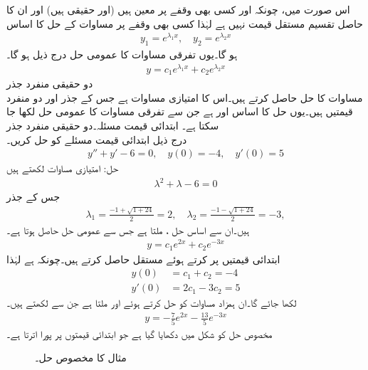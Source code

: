اس صورت میں، چونکہ  اور  کسی بھی وقفے  پر معین ہیں (اور حقیقی ہیں)  اور ان کا حاصل تقسیم مستقل قیمت نہیں ہے لہٰذا کسی بھی وقفے  پر مساوات  کے حل کا اساس
\begin{align}
y_1=e^{\lambda_1 x}, \quad y_2=e^{\lambda_2 x}
\end{align}
ہو گا۔یوں تفرقی مساوات کا عمومی حل درج ذیل ہو گا۔
\begin{align}
y=c_1e^{\lambda_1 x}+c_2 e^{\lambda_2 x}
\end{align}
\quad دو حقیقی منفرد جذر\\
مساوات  کا حل حاصل کرتے ہیں۔اس کا امتیازی مساوات  ہے جس کے جذر  اور   دو منفرد قیمتیں ہیں۔یوں حل کا اساس  اور  ہے جن سے تفرقی مساوات کا عمومی حل  لکھا جا سکتا ہے۔
\quad ابتدائی قیمت مسئلہ۔دو حقیقی منفرد جذر\\
درج ذیل ابتدائی قیمت مسئلے کو حل کریں۔
\begin{align*}
y''+y'-6=0,\quad y(0)=-4, \quad y'(0)=5
\end{align*} 
حل: امتیازی مساوات لکھتے ہیں
\begin{align*}
\lambda^2+\lambda-6=0
\end{align*}
جس کے جذر
\begin{align*}
\lambda_1=\frac{-1+\sqrt{1+24}}{2}=2, \quad \lambda_2=\frac{-1-\sqrt{1+24}}{2}=-3,
\end{align*}
ہیں۔ان سے اساس حل ،  ملتا ہے جس سے عمومی حل حاصل ہوتا ہے۔
\begin{align*}
y=c_1e^{2x}+c_2e^{-3x}
\end{align*}
ابتدائی قیمتیں پر کرتے ہوئے مستقل حاصل کرتے ہیں۔چونکہ  ہے لہٰذا
\begin{align*}
y(0)&=c_1+c_2=-4\\
y'(0)&=2c_1-3c_2=5
\end{align*}
لکھا جائے گا۔ان ہمزاد مساوات کو حل کرتے ہوئے  اور  ملتا ہے جن سے  لکھتے ہیں۔
 \begin{align*}
y=-\frac{7}{5}e^{2x}-\frac{13}{5}e^{-3x}
\end{align*}
مخصوص حل کو شکل  میں دکھایا گیا ہے جو ابتدائی قیمتوں پر پورا اترتا ہے۔
%
\begin{figure}
\centering
{}
\caption{مثال  کا مخصوص حل۔}
\label{شکل_مثال_سادہ_دو_درجی_حقیقی_منفرد_جذر_الف}
\end{figure}


